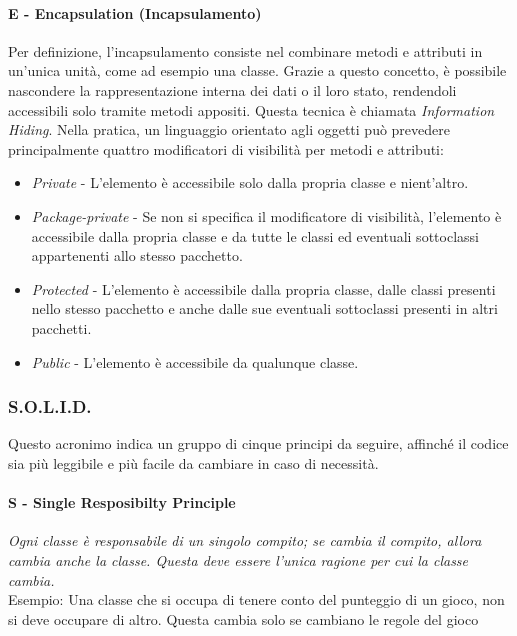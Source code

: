 \documentclass{article}
\begin{document}
            \paragraph{E - Encapsulation (Incapsulamento)} Per definizione, l'incapsulamento consiste nel combinare metodi e attributi in un'unica unità, come ad esempio una classe. Grazie a questo concetto, è possibile nascondere la rappresentazione interna dei dati o il loro stato, rendendoli accessibili solo tramite metodi appositi. Questa tecnica è chiamata \textit{Information Hiding}. Nella pratica, un linguaggio orientato agli oggetti può prevedere principalmente quattro modificatori di visibilità per metodi e attributi:
                \begin{itemize}
                    \item \textit{Private} - L'elemento è accessibile solo dalla propria classe e nient'altro.
                    \item \textit{Package-private} - Se non si specifica il modificatore di visibilità, l'elemento è accessibile dalla propria classe e da tutte le classi ed eventuali sottoclassi appartenenti allo stesso pacchetto.
                    \item \textit{Protected} - L'elemento è accessibile dalla propria classe, dalle classi presenti nello stesso pacchetto e anche dalle sue eventuali sottoclassi presenti in altri pacchetti.
                    \item \textit{Public} - L'elemento è accessibile da qualunque classe.
                \end{itemize}
            
        \subsubsection{S.O.L.I.D.}
            Questo acronimo indica un gruppo di cinque principi da seguire, affinché il codice sia più leggibile e più facile da cambiare in caso di necessità.
            \paragraph{S - Single Resposibilty Principle} \textit{Ogni classe è responsabile di un singolo compito; se cambia il compito, allora cambia anche la classe. Questa deve essere l'unica ragione per cui la classe cambia.}\\
            Esempio: Una classe che si occupa di tenere conto del punteggio di un gioco, non si deve occupare di altro. Questa cambia solo se cambiano le regole del gioco
\end{document}
